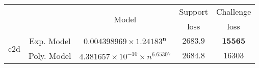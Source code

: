 \begin{tabular}{ccccc} 
\hline 
 &  & \multirow{2}{*}{Model} & Support & Challenge\tabularnewline 
 &  &  & loss  & loss\tabularnewline 
\hline 
\hline 
\multirow{2}{*}{c2d} & Exp. Model & $\mathbf{0.004398969\times 1.24183^{n}}$ & $\mathbf{2683.9}$ & $\mathbf{15565}$ \tabularnewline 
 & Poly. Model & $4.381657\times10^{-10}\times n^{6.65307}$ & $2684.8$ & $16303$ \tabularnewline 
\hline 
\end{tabular} 

